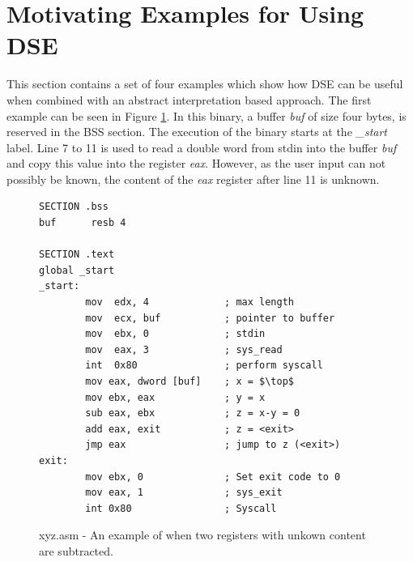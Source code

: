 \documentclass{kththesis}
\newcommand{\fbcomment}[1]{{#1}}
\renewcommand{\fbcomment}[1]{}
\renewcommand{\it}[1]{\textit{#1}}
\begin{document}


\section{Motivating Examples for Using DSE}\label{sec:MotExamples}
\fbcomment{\color{red}Goal: Provide 4 examples of when DSE can be useful. (Ex 1: A case that can be handled by DSE but not Jakstab. Ex 2: Why it is important to alternate multiple times between under and over-approximation, Ex 3: Why the second version has higher soundness. Ex 4: That the under-approximation can be useful even when there is a true top in a binary)}
This section contains a set of four examples which show how DSE can be useful when combined with an abstract interpretation based approach. The first example can be seen in Figure \ref{fig:xyz.asm}. In this binary, a buffer \it{buf} of size four bytes, is reserved in the BSS section. The execution of the binary starts at the \it{\_start} label. Line 7 to 11 is used to read a double word from stdin into the buffer \it{buf} and copy this value into the register \it{eax}. However, as the user input can not possibly be known, the content of the \it{eax} register after line 11 is unknown.
\begin{figure}[!th]
    \centering
\begin{tcolorbox}
\begin{verbatim}
SECTION .bss
buf      resb 4

SECTION .text
global _start
_start:
        mov  edx, 4             ; max length
        mov  ecx, buf           ; pointer to buffer
        mov  ebx, 0             ; stdin
        mov  eax, 3             ; sys_read
        int  0x80               ; perform syscall
        mov eax, dword [buf]    ; x = $\top$
        mov ebx, eax            ; y = x
        sub eax, ebx            ; z = x-y = 0
        add eax, exit           ; z = <exit>
        jmp eax                 ; jump to z (<exit>)
exit:
        mov ebx, 0              ; Set exit code to 0
        mov eax, 1              ; sys_exit
        int 0x80                ; Syscall
\end{verbatim}
\end{tcolorbox}
\caption{xyz.asm - An example of when two registers with unkown content are subtracted.}
    \label{fig:xyz.asm}
\end{figure}
\end{document}
